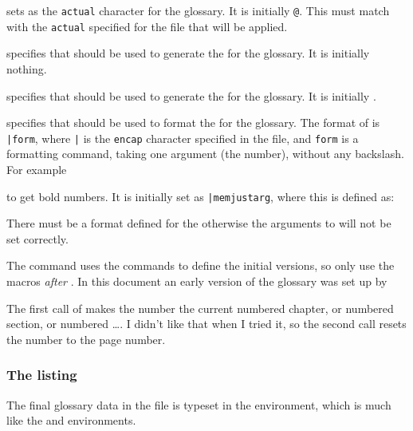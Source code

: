 \cmd{\changeglossactual} sets  as the \texttt{actual} character
for the  glossary. It is initially \verb+@+. This must match 
with the \texttt{actual} specified for the  file that will 
be applied.

\cmd{\changeglossref} specifies that  should be used
to generate the  for the  glossary. It is
initially nothing.

\cmd{\changeglossnum} specifies that  should be used
to generate the  for the  glossary. It is
initially .

\cmd{\changeglossnumformat} specifies that  should be used
to format the  for the  glossary. The format
of  is \verb?|form?, where \verb?|? is the \texttt{encap}
character specified in the  file, and \verb?form? is a
formatting command, taking one argument (the number), without any backslash. 
For example
\begin{lcode}
\end{lcode}
 to get bold numbers. It is
initially set as \verb?|memjustarg?, where this is defined as:
\begin{lcode}
\newcommand{\memjustarg}[1]{#1}
\end{lcode}
There must be a format defined for the  otherwise the arguments
to \cmd{\glossitem} will not be set correctly.


    The \cmd{\makeglossary} command uses the 
commands to define the initial versions, so only use the 
macros \emph{after} \cmd{\makeglossary}.
In this document an early version of the glossary was set up by
\begin{lcode}
\makeglossary
{}
\makeatletter 
\changeglossnum{\@currentlabel} 
\makeatother
\changeglossnum{\thepage}
\end{lcode}
The first call of \cmd{\changeglossnum} makes the number the current 
numbered chapter, or numbered section, or numbered \ldots. I didn't 
like that when I tried it, so the second call resets the number to 
the page number.

\subsubsection{The listing}

    The final glossary data in the  file is typeset in the
 environment, which is much like the 
and  environments.

